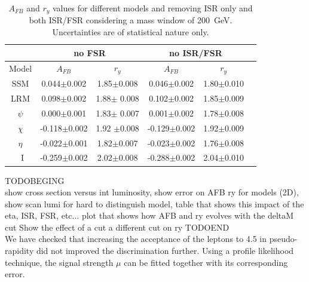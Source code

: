 \begin{table}
\centering
\begin{tabular}{| c | c | c | c | c | c |} \hline\hline
 & \multicolumn{2}{c|}{no FSR} & \multicolumn{2}{c|}{no ISR/FSR}\\

\hline
  Model &  $A_{FB}$                &  $r_y$                    &  $A_{FB}$   &  $r_y$      \\
\hline
SSM    &   0.044$\pm$0.002    &  1.85$\pm$0.008  &  0.046$\pm$0.002  &  1.80$\pm$0.010   \\
LRM    &   0.098$\pm$0.002    &  1.88$\pm$ 0.008 &  0.102$\pm$0.002  &  1.85$\pm$0.009 \\
$\psi$  &   0.000$\pm$0.001    &  1.83$\pm$ 0.007 &   0.001$\pm$0.002 &  1.78$\pm$0.008\\
$\chi$  &   -0.118$\pm$0.002   &  1.92 $\pm$0.008 &  -0.129$\pm$0.002 &  1.92$\pm$0.009\\
$\eta$  &   -0.022$\pm$0.001  & 1.82$\pm$0.007   &  -0.023$\pm$0.002 &  1.76$\pm$0.008 \\
~I         &   -0.259$\pm$0.002  &  2.02$\pm$0.008  &   -0.288$\pm$0.002 &  2.04$\pm$0.010\\
\hline\hline
\end{tabular}
\caption{$A_{FB}$ and $r_y$ values for different models and removing ISR only and both ISR/FSR considering a mass window of 200~GeV. Uncertainties are of statistical nature only.}
\label{tab:leptonicresonances:comp2}
\end{table}




\label{subsubsection:results}
TODOBEGING\\
show cross section versus int luminosity, show error on AFB ry for models (2D), show scan lumi for hard to distinguish model, table that shows this impact of the eta, ISR, FSR, etc...
plot that shows how AFB and ry evolves with the deltaM cut
Show the effect of a cut a different cut on ry
TODOEND\\

We have checked that increasing the acceptance of the leptons to 4.5 in pseudo-rapidity did not improved the discrimination further. 
Using a profile likelihood technique, the signal strength $\mu$ can be fitted together with its corresponding error. 


